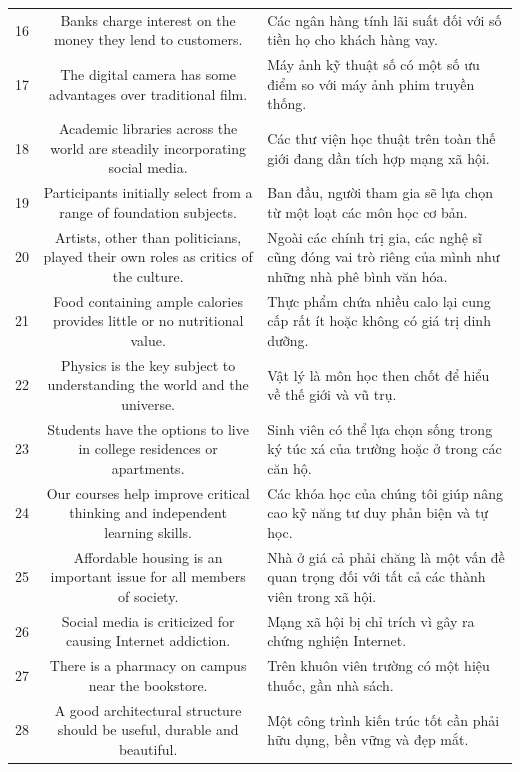 \documentclass[11pt,a4paper]{article}
\begin{document}
\begin{longtable}{N S M}
16 & Banks charge interest on the money they lend to customers. & Các ngân hàng tính lãi suất đối với số tiền họ cho khách hàng vay. \\
17 & The digital camera has some advantages over traditional film. & Máy ảnh kỹ thuật số có một số ưu điểm so với máy ảnh phim truyền thống. \\
18 & Academic libraries across the world are steadily incorporating social media. & Các thư viện học thuật trên toàn thế giới đang dần tích hợp mạng xã hội. \\
19 & Participants initially select from a range of foundation subjects. & Ban đầu, người tham gia sẽ lựa chọn từ một loạt các môn học cơ bản. \\
20 & Artists, other than politicians, played their own roles as critics of the culture. & Ngoài các chính trị gia, các nghệ sĩ cũng đóng vai trò riêng của mình như những nhà phê bình văn hóa. \\
21 & Food containing ample calories provides little or no nutritional value. & Thực phẩm chứa nhiều calo lại cung cấp rất ít hoặc không có giá trị dinh dưỡng. \\
22 & Physics is the key subject to understanding the world and the universe. & Vật lý là môn học then chốt để hiểu về thế giới và vũ trụ. \\
23 & Students have the options to live in college residences or apartments. & Sinh viên có thể lựa chọn sống trong ký túc xá của trường hoặc ở trong các căn hộ. \\
24 & Our courses help improve critical thinking and independent learning skills. & Các khóa học của chúng tôi giúp nâng cao kỹ năng tư duy phản biện và tự học. \\
25 & Affordable housing is an important issue for all members of society. & Nhà ở giá cả phải chăng là một vấn đề quan trọng đối với tất cả các thành viên trong xã hội. \\
26 & Social media is criticized for causing Internet addiction. & Mạng xã hội bị chỉ trích vì gây ra chứng nghiện Internet. \\
27 & There is a pharmacy on campus near the bookstore. & Trên khuôn viên trường có một hiệu thuốc, gần nhà sách. \\
28 & A good architectural structure should be useful, durable and beautiful. & Một công trình kiến ​​trúc tốt cần phải hữu dụng, bền vững và đẹp mắt. \\

\end{longtable}
\end{document}
